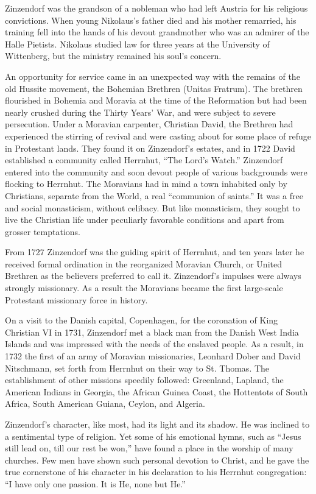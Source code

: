 Zinzendorf was the grandson of a nobleman who had left Austria for his religious convictions. When
young Nikolaus’s father died and his mother remarried, his training fell into the hands of his
devout grandmother who was an admirer of the Halle Pietists. Nikolaus studied law for three years at
the University of Wittenberg, but the ministry remained his soul’s concern.

An opportunity for service came in an unexpected way with the remains of the old Hussite movement,
the Bohemian Brethren (Unitas Fratrum). The brethren flourished in Bohemia and Moravia at the time
of the Reformation but had been nearly crushed during the Thirty Years’ War, and were subject to
severe persecution. Under a Moravian carpenter, Christian David, the Brethren had experienced the
stirring of revival and were casting about for some place of refuge in Protestant lands. They found
it on Zinzendorf’s estates, and in 1722 David established a community called Herrnhut, “The Lord’s
Watch.” Zinzendorf entered into the community and soon devout people of various backgrounds were
flocking to Herrnhut. The Moravians had in mind a town inhabited only by Christians, separate from
the World, a real “communion of saints.” It was a free and social monasticism, without celibacy. But
like monasticism, they sought to live the Christian life under peculiarly favorable conditions and
apart from grosser temptations.

From 1727 Zinzendorf was the guiding spirit of Herrnhut, and ten years later he received formal
ordination in the reorganized Moravian Church, or United Brethren as the believers preferred to call
it. Zinzendorf’s impulses were always strongly missionary. As a result the Moravians became the
first large-scale Protestant missionary force in history.

On a visit to the Danish capital, Copenhagen, for the coronation of King Christian VI in 1731,
Zinzendorf met a black man from the Danish West India Islands and was impressed with the needs of
the enslaved people. As a result, in 1732 the first of an army of Moravian missionaries, Leonhard
Dober and David Nitschmann, set forth from Herrnhut on their way to St. Thomas. The establishment of
other missions speedily followed: Greenland, Lapland, the American Indians in Georgia, the African
Guinea Coast, the Hottentots of South Africa, South American Guiana, Ceylon, and Algeria.

Zinzendorf’s character, like most, had its light and its shadow. He was inclined to a sentimental
type of religion. Yet some of his emotional hymns, such as “Jesus still lead on, till our rest be
won,” have found a place in the worship of many churches. Few men have shown such personal devotion
to Christ, and he gave the true cornerstone of his character in his declaration to his Herrnhut
congregation: “I have only one passion. It is He, none but He.”

